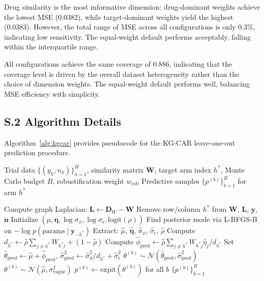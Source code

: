 \documentclass[12pt]{article}
\newcommand{\bW}{\mathbf{W}}
\newcommand{\bL}{\mathbf{L}}
\newcommand{\bD}{\mathbf{D}}
\begin{document}
{Drug similarity is the most informative dimension: drug-dominant weights achieve the lowest MSE (0.0382), while target-dominant weights yield the highest (0.0383). However, the total range of MSE across all configurations is only 0.3\%, indicating low sensitivity. The equal-weight default performs acceptably, falling within the interquartile range.

All configurations achieve the same coverage of 0.886, indicating that the coverage level is driven by the overall dataset heterogeneity rather than the choice of dimension weights. The equal-weight default performs well, balancing MSE efficiency with simplicity.

\subsection*{S.2 Algorithm Details}

Algorithm~\ref{alg:kgcar} provides pseudocode for the KG-CAR leave-one-out prediction procedure.

\begin{algorithm}[ht]
\caption{KG-CAR Leave-One-Out Prediction}
\label{alg:kgcar}
\begin{algorithmic}[1]
\REQUIRE Trial data $\{(y_h, n_h)\}_{h=1}^H$, similarity matrix $\bW$, target arm index $h^*$, Monte Carlo budget $B$, robustification weight $w_{\text{rob}}$
\ENSURE Predictive samples $\{p^{(b)}\}_{b=1}^B$ for arm $h^*$

\STATE Compute graph Laplacian: $\bL \gets \bD_W - \bW$
\STATE Remove row/column $h^*$ from $\bW$, $\bL$, $\mathbf{y}$, $\mathbf{n}$
\STATE Initialize $(\mu, \boldsymbol{\eta}, \log\sigma_\phi, \log\sigma_\epsilon, \text{logit}(\rho))$
\STATE Find posterior mode via L-BFGS-B on $-\log p(\text{params} \mid \mathbf{y}_{-h^*})$
\STATE Extract: $\hat{\mu}$, $\hat{\boldsymbol{\eta}}$, $\hat{\sigma}_\phi$, $\hat{\sigma}_\epsilon$, $\hat{\rho}$
\STATE Compute $d_{h^*} \gets \hat{\rho} \sum_{j \neq h^*} W_{h^* j} + (1 - \hat{\rho})$
\STATE Compute $\hat{\phi}_{\text{pred}} \gets \hat{\rho} \sum_{j \neq h^*} W_{h^* j} \hat{\eta}_j / d_{h^*}$
\STATE Set $\hat{\theta}_{\text{pred}} \gets \hat{\mu} + \hat{\phi}_{\text{pred}}$, $\hat{\sigma}_{\text{pred}}^2 \gets \hat{\sigma}_\phi^2 / d_{h^*} + \hat{\sigma}_\epsilon^2$
  \STATE $\theta^{(b)} \sim \mathcal{N}(\hat{\theta}_{\text{pred}}, \hat{\sigma}_{\text{pred}}^2)$ \hfill {}
\ENDFOR
{}
  \STATE $\theta^{(b)} \sim \mathcal{N}(\hat{\mu}, \sigma_{\text{vague}}^2)$ \hfill {}
\ENDFOR
\STATE $p^{(b)} \gets \text{expit}(\theta^{(b)})$ for all $b$
\RETURN $\{p^{(b)}\}_{b=1}^B$
\end{algorithmic}
\end{algorithm}

}
\end{document}
